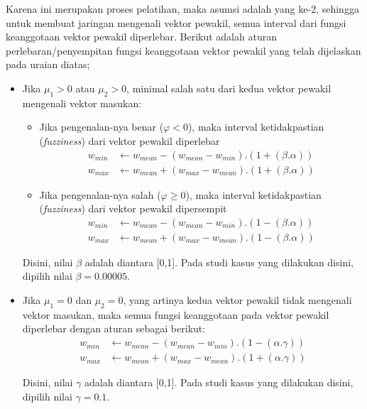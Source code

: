 \noindent Karena ini merupakan proses pelatihan, maka asumsi adalah
yang ke-2, sehingga untuk membuat jaringan mengenali vektor pewakil, semua
interval dari fungsi keanggotaan vektor pewakil diperlebar. Berikut adalah
aturan perlebaran/penyempitan fungsi keanggotaan vektor pewakil yang telah
dijelaskan pada uraian diatas;
\begin{itemize}
  \setlength{\itemsep}{1pt}
  \setlength{\parskip}{0pt}
  \setlength{\parsep}{0pt}
  \item Jika  $\mu_1 > 0$ atau $\mu_2 > 0$, minimal salah satu dari kedua
  vektor pewakil mengenali vektor masukan:
  \begin{itemize}
  \setlength{\itemsep}{1pt}
  \setlength{\parskip}{0pt}
  \setlength{\parsep}{0pt}
    \item Jika pengenalan-nya benar ($\varphi < 0$), maka interval
    ketidakpastian (\emph{fuzziness}) dari vektor pewakil diperlebar
    	\begin{align}
    	w_{min} &\leftarrow w_{mean} - (w_{mean} - w_{min}) . (1 + (\beta .
    	\alpha)) \nonumber \\
    	w_{max} &\leftarrow w_{mean} + (w_{max} - w_{mean}) . (1 + (\beta .
    	\alpha)) 
    	\end{align}
    \item Jika pengenalan-nya salah ($\varphi \geq 0$), maka interval
    ketidakpastian (\emph{fuzziness}) dari vektor pewakil dipersempit
    	\begin{align}
    	w_{min} &\leftarrow w_{mean} - (w_{mean} - w_{min}) . (1 - (\beta .
    	\alpha)) \nonumber \\
    	w_{max} &\leftarrow w_{mean} + (w_{max} - w_{mean}) . (1 - (\beta .
    	\alpha)) 
    	\end{align}
  \end{itemize}
  
  Disini, nilai $\beta$ adalah diantara [0,1]. Pada studi kasus yang dilakukan
  disini, dipilih nilai $\beta = 0.00005$.
  
  \item Jika  $\mu_1=0$ dan $\mu_2=0$, yang artinya kedua vektor pewakil
  tidak mengenali vektor masukan, maka semua fungsi keanggotaan pada vektor
  pewakil diperlebar dengan aturan sebagai berikut:
  	\begin{align}
	w_{min} &\leftarrow w_{mean} - (w_{mean} - w_{min}) . (1 - (\alpha .
	\gamma)) \nonumber \\ 
	w_{max} &\leftarrow w_{mean} + (w_{max} - w_{mean})
	. (1 + (\alpha . \gamma)) 
	\end{align}
	
	Disini, nilai $\gamma$ adalah diantara [0,1]. Pada studi kasus yang dilakukan
	disini, dipilih nilai $\gamma = 0.1$.
\end{itemize}  


